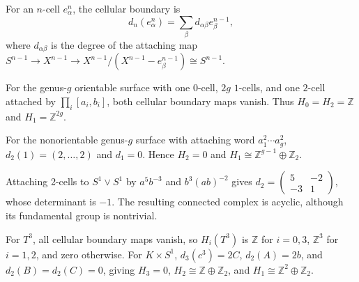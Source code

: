 For an $n$-cell $e_\alpha^n$, the cellular boundary is
\[
d_n(e_\alpha^n)=\sum_\beta d_{\alpha\beta}e_\beta^{n-1},
\]
where $d_{\alpha\beta}$ is the degree of the attaching map $S^{n-1}\to X^{n-1}\to X^{n-1}/(X^{n-1}-e_\beta^{n-1})\cong S^{n-1}$.

\begin{example}
\label{ex:cellular-homology-spheres}

For the genus-$g$ orientable surface with one $0$-cell, $2g$ $1$-cells, and one $2$-cell attached by $\prod_i[a_i,b_i]$, both cellular boundary maps vanish.  Thus $H_0=H_2=\mathbb{Z}$ and $H_1=\mathbb{Z}^{2g}$.
\end{example}

\begin{example}
\label{ex:cellular-homology-surfaces}

For the nonorientable genus-$g$ surface with attaching word $a_1^2\cdots a_g^2$, $d_2(1)=(2,\ldots,2)$ and $d_1=0$.  Hence $H_2=0$ and $H_1\cong\mathbb{Z}^{g-1}\oplus\mathbb{Z}_2$.
\end{example}

\begin{example}
\label{ex:acyclic-space}

Attaching 2-cells to $S^1\vee S^1$ by $a^5b^{-3}$ and $b^3(ab)^{-2}$ gives $d_2=\begin{pmatrix}5&-2\\-3&1\end{pmatrix}$, whose determinant is $-1$.  The resulting connected complex is acyclic, although its fundamental group is nontrivial.
\end{example}

\begin{example}
\label{ex:three-torus}

For $T^3$, all cellular boundary maps vanish, so $H_i(T^3)$ is $\mathbb{Z}$ for $i=0,3$, $\mathbb{Z}^3$ for $i=1,2$, and zero otherwise.  For $K\times S^1$, $d_3(c^3)=2C$, $d_2(A)=2b$, and $d_2(B)=d_2(C)=0$, giving $H_3=0$, $H_2\cong\mathbb{Z}\oplus\mathbb{Z}_2$, and $H_1\cong\mathbb{Z}^2\oplus\mathbb{Z}_2$.
\end{example}

